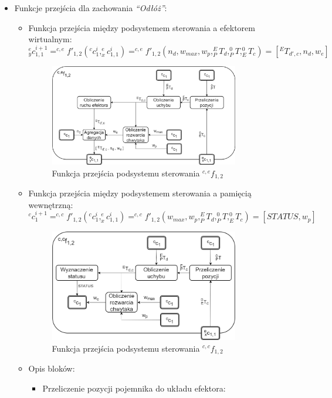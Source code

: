 \documentclass{article}
\begin{document}
\begin{itemize}
\item Funkcje przej\'scia dla zachowania \textit{``Odłóż''}:
\begin{itemize}
\item Funkcja przej\'scia między podsystemem sterowania a efektorem wirtualnym:
\[ ^e_yc_{1,1}^{i+1}= ^{c,e}f'_{1,2}(^cc_1^i,^e_xc_{1,1}^i)= ^{c,e}f'_{1,2}(n_d,w_{max},w_p,^E_PT_d,^0_PT,^0_ET_c)=[ ^ET_{d',c},n_d,w_e ]\]
\begin{figure}[H]
	\centering
	\includegraphics[width=0.83\textwidth]{PS_funkcje1v2.png}
	\caption{Funkcja przej\'scia podsystemu sterowania $^{c,e}f_{1,2}$}
	\label{fig::PS_funkcje1v2}
\end{figure}
\item Funkcja przej\'scia między podsystemem sterowania a pamięcią wewnętrzną:
\[ ^cc_{1}^{i+1}= ^{c,c}f'_{1,2}(^cc_1^i,^e_xc_{1,1}^i)= ^{c,c}f'_{1,2}(w_{max},w_p,^E_PT_d,^0_PT,^0_ET_c) = [STATUS,w_p]\]
\begin{figure}[H]
	\centering
	\includegraphics[width=0.83\textwidth]{PS_funkcje2v2.png}
	\caption{Funkcja przej\'scia podsystemu sterowania $^{c,c}f_{1,2}$}
	\label{fig::PS_funkcje2v2}
\end{figure}
\item Opis bloków:
\begin{itemize}
\item Przeliczenie pozycji pojemnika do układu efektora: 

\end{itemize}
\end{itemize}
\end{itemize}
\end{document}

